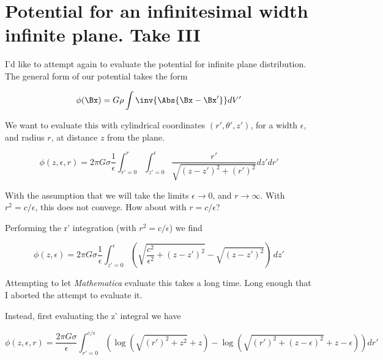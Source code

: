%


\chapter{Potential for an infinitesimal width infinite plane.  Take III}
\label{chap:InfinitePlanePotentialTakeIII}
{}
\date{Feb 24, 2012}

\beginArtNoToc

I'd like to attempt again to evaluate the potential for infinite plane distribution.  The general form of our potential takes the form

\begin{equation}\label{eqn:InfinitePlanePotentialTakeIII:10}
\phi(\Bx) = G \rho \int \inv{\Abs{\Bx - \Bx'}} dV'
\end{equation}

We want to evaluate this with cylindrical coordinates $(r', \theta', z')$, for a width $\epsilon$, and radius $r$, at distance $z$ from the plane.
 

\begin{equation}\label{eqn:InfinitePlanePotentialTakeIII:30}
\phi (z, \epsilon , r)= 2 \pi  G \sigma  \frac{1}{\epsilon }\int _{r' = 0}^r\int _{z' = 0}^{\epsilon }\frac{r'}{\sqrt{\left(z-z'\right)^2+\left(r'\right)^2}}dz'dr'
\end{equation}

With the assumption that we will take the limits $\epsilon \rightarrow 0$, and $r \rightarrow \infty$.  With $r^2 = c/\epsilon$, this does not convege.  How about with $r = c/\epsilon$?

Performing the r' integration (with $r^2 = c/\epsilon$) we find

\begin{equation}\label{eqn:InfinitePlanePotentialTakeIII:50}
\phi (z, \epsilon )= 2 \pi  G \sigma  \frac{1}{\epsilon }\int_{z' = 0}^{\epsilon } \left(\sqrt{\frac{c^2}{\epsilon ^2}+(z-z')^2}-\sqrt{(z-z')^2}\right) \, dz'
\end{equation}

Attempting to let \textit{Mathematica} evaluate this takes a long time.  Long enough that I aborted the attempt to evaluate it.

Instead, first evaluating the z' integral we have

\begin{equation}\label{eqn:InfinitePlanePotentialTakeIII:70}
\phi (z, \epsilon , r)=\frac{2 \pi  G \sigma }{\epsilon }
\int _{r' = 0}^{c/\epsilon }\left(\log \left(\sqrt{\left(r'\right)^2+z^2}+z\right)-\log \left(\sqrt{\left(r'\right)^2+(z-\epsilon )^2}+z-\epsilon \right)\right)
dr'
\end{equation}

